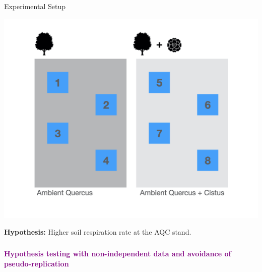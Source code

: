 \documentclass{beamer}
\begin{document}
\begin{frame}{Experimental Setup}
\begin{center}
\begin{minipage}{0.45\linewidth}
    \includegraphics[width=\linewidth]{lectures/day_1_intro_to_mems/figures/respiration.jpeg}
  \end{minipage}
\end{center}


\textbf{Hypothesis:} Higher soil respiration rate at the AQC stand.
\end{frame}

\begin{frame}
  \frametitle{}
  \begin{center}
    \huge\textbf{\textcolor{purple}{Hypothesis testing with non-independent data and avoidance of pseudo-replication}}
  \end{center}
\end{frame}
\end{document}
